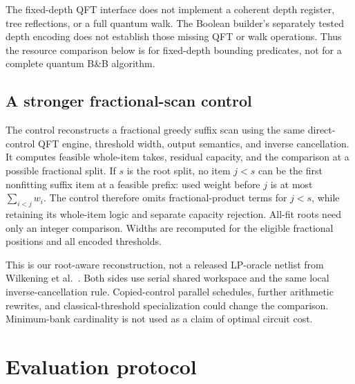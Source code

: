 \documentclass[referee,pdflatex,sn-mathphys-num]{sn-jnl}
\theoremstyle{thmstyleone}
\theoremstyle{thmstyletwo}
\begin{document}
The fixed-depth QFT interface does not implement a coherent depth register, tree reflections, or a full quantum walk. The Boolean builder's separately tested depth encoding does not establish those missing QFT or walk operations. Thus the resource comparison below is for fixed-depth bounding predicates, not for a complete quantum B\&B algorithm.

\subsection{A stronger fractional-scan control}
The control reconstructs a fractional greedy suffix scan using the same direct-control QFT engine, threshold width, output semantics, and inverse cancellation. It computes feasible whole-item takes, residual capacity, and the comparison at a possible fractional split. If $s$ is the root split, no item $j<s$ can be the first nonfitting suffix item at a feasible prefix: used weight before $j$ is at most $\sum_{i<j}w_i$. The control therefore omits fractional-product terms for $j<s$, while retaining its whole-item logic and separate capacity rejection. All-fit roots need only an integer comparison. Widths are recomputed for the eligible fractional positions and all encoded thresholds.

This is our root-aware reconstruction, not a released LP-oracle netlist from Wilkening et al.\ \cite{wilkening2025,wilkening2025code}. Both sides use serial shared workspace and the same local inverse-cancellation rule. Copied-control parallel schedules, further arithmetic rewrites, and classical-threshold specialization could change the comparison. Minimum-bank cardinality is not used as a claim of optimal circuit cost.

\section{Evaluation protocol}\label{sec:methods}
\end{document}
